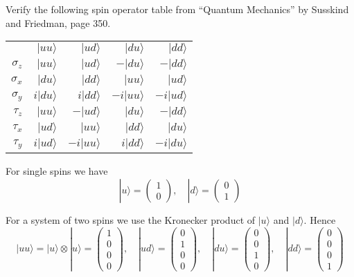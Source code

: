 \documentclass[12pt]{article}
\begin{document}
Verify the following spin operator table from ``Quantum Mechanics'' by Susskind and Friedman, page 350.

\begin{center}
\begin{tabular}{rrrrr}
& $|uu\rangle$ & $|ud\rangle$ & $|du\rangle$ & $|dd\rangle$
\\[1ex]
$\sigma_z$ & $|uu\rangle$ & $|ud\rangle$ & $-|du\rangle$ & $-|dd\rangle$
\\
$\sigma_x$ & $|du\rangle$ & $|dd\rangle$ & $|uu\rangle$ & $|ud\rangle$
\\
$\sigma_y$ & $i|du\rangle$ & $i|dd\rangle$ & $-i|uu\rangle$ & $-i|ud\rangle$
\\
$\tau_z$ & $|uu\rangle$ & $-|ud\rangle$ & $|du\rangle$ & $-|dd\rangle$
\\
$\tau_x$ & $|ud\rangle$ & $|uu\rangle$ & $|dd\rangle$ & $|du\rangle$
\\
$\tau_y$ & $i|ud\rangle$ & $-i|uu\rangle$ & $i|dd\rangle$ & $-i|du\rangle$
\end{tabular}
\end{center}

For single spins we have
\begin{equation*}
|u\rangle=\begin{pmatrix}1\\0\end{pmatrix},
\quad
|d\rangle=\begin{pmatrix}0\\1\end{pmatrix}
\end{equation*}

For a system of two spins we use the Kronecker product of $|u\rangle$ and $|d\rangle$.
Hence
\begin{equation*}
|uu\rangle=|u\rangle\otimes|u\rangle=\begin{pmatrix}1\\0\\0\\0\end{pmatrix},
\quad
|ud\rangle=\begin{pmatrix}0\\1\\0\\0\end{pmatrix},
\quad
|du\rangle=\begin{pmatrix}0\\0\\1\\0\end{pmatrix},
\quad
|dd\rangle=\begin{pmatrix}0\\0\\0\\1\end{pmatrix}
\end{equation*}
\end{document}
